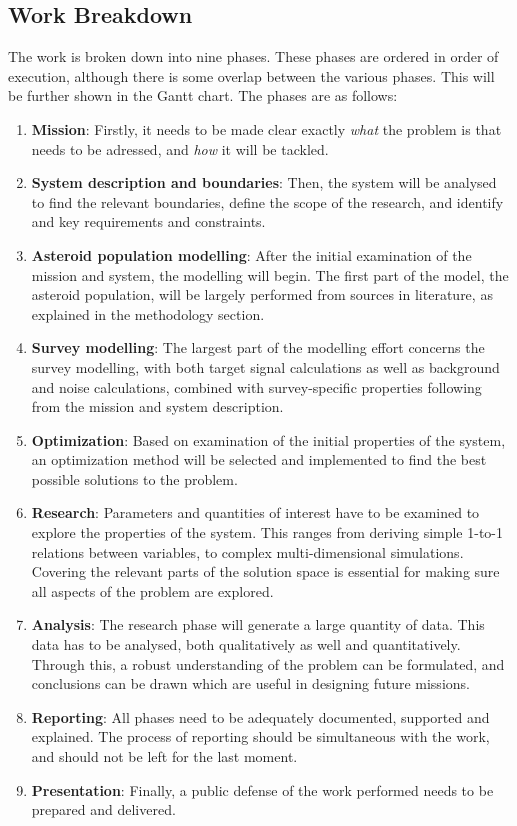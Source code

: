 \documentclass[12pt, english, NoHyper]{AE4010-template}
\begin{document}
\subsection{Work Breakdown}
The work is broken down into nine phases. These phases are ordered in order of execution, although there is some overlap between the various phases. This will be further shown in the Gantt chart. The phases are as follows:
\begin{enumerate}
\setlength\itemsep{-0.5em}
 \item \textbf{Mission}: Firstly, it needs to be made clear exactly \textit{what} the problem is that needs to be adressed, and \textit{how} it will be tackled.
 \item \textbf{System description and boundaries}: Then, the system will be analysed to find the relevant boundaries, define the scope of the research, and identify and key requirements and constraints.
 \item \textbf{Asteroid population modelling}: After the initial examination of the mission and system, the modelling will begin. The first part of the model, the asteroid population, will be largely performed from sources in literature, as explained in the methodology section.
 \item \textbf{Survey modelling}: The largest part of the modelling effort concerns the survey modelling, with both target signal calculations as well as background and noise calculations, combined with survey-specific properties following from the mission and system description.
 \item \textbf{Optimization}: Based on examination of the initial properties of the system, an optimization method will be selected and implemented to find the best possible solutions to the problem.
 \item \textbf{Research}: Parameters and quantities of interest have to be examined to explore the properties of the system. This ranges from deriving simple 1-to-1 relations between variables, to complex multi-dimensional simulations. Covering the relevant parts of the solution space is essential for making sure all aspects of the problem are explored.
 \item \textbf{Analysis}: The research phase will generate a large quantity of data. This data has to be analysed, both qualitatively as well and quantitatively. Through this, a robust understanding of the problem can be formulated, and conclusions can be drawn which are useful in designing future missions.
 \item \textbf{Reporting}: All phases need to be adequately documented, supported and explained. The process of reporting should be simultaneous with the work, and should not be left for the last moment.
 \item \textbf{Presentation}: Finally, a public defense of the work performed needs to be prepared and delivered.
\end{enumerate}
\end{document}
